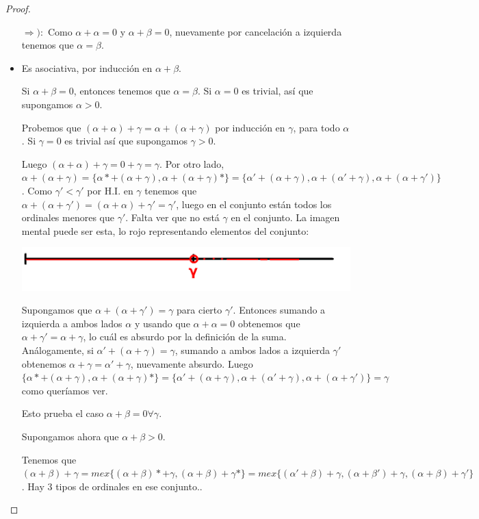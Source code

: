 \documentclass[10pt,a4paper,final]{report}
\def\key#1{\{#1\}}
\begin{document}
\begin{proof}
\begin{itemize}
$\Rightarrow):$ Como $\alpha + \alpha = 0$ y $\alpha + \beta  = 0$, nuevamente por cancelación a izquierda tenemos que $\alpha = \beta$.

\item Es asociativa, por inducción en $\alpha + \beta$.

Si $\alpha + \beta = 0$, entonces tenemos que $\alpha = \beta$. Si $\alpha=0$ es trivial, así que supongamos $\alpha>0$.

Probemos que $(\alpha + \alpha) + \gamma = \alpha + (\alpha + \gamma)$ por inducción en $\gamma$, para todo $\alpha$. Si $\gamma = 0$ es trivial así que supongamos $\gamma > 0$.

Luego $(\alpha + \alpha) + \gamma = 0 + \gamma = \gamma$. Por otro lado, $\alpha + (\alpha + \gamma) = \key{\alpha* + (\alpha + \gamma), \alpha + (\alpha + \gamma)*} = \key{\alpha' + (\alpha + \gamma), \alpha + (\alpha' + \gamma), \alpha + (\alpha + \gamma')}$. Como $\gamma'<\gamma'$ por H.I. en $\gamma$ tenemos que $\alpha + (\alpha + \gamma') = (\alpha + \alpha) + \gamma' = \gamma'$, luego en el conjunto están todos los ordinales menores que $\gamma'$. Falta ver que no está $\gamma$ en el conjunto. La imagen mental puede ser esta, lo rojo representando elementos del conjunto:

\includegraphics[scale=0.3]{mex_gamma.png}

Supongamos que $\alpha + (\alpha + \gamma') = \gamma$ para cierto $\gamma'$. Entonces sumando a izquierda a ambos lados $\alpha$ y usando que $\alpha + \alpha = 0$ obtenemos que $\alpha + \gamma' = \alpha + \gamma$, lo cuál es absurdo por la definición de la suma. Análogamente, si $\alpha' + (\alpha + \gamma) = \gamma$, sumando a ambos lados a izquierda $\gamma'$ obtenemos $\alpha + \gamma = \alpha' + \gamma$, nuevamente absurdo. Luego $\key{\alpha* + (\alpha + \gamma), \alpha + (\alpha + \gamma)*} = \key{\alpha' + (\alpha + \gamma), \alpha + (\alpha' + \gamma), \alpha + (\alpha + \gamma')} = \gamma$ como queríamos ver.

Esto prueba el caso $\alpha + \beta = 0 \forall \gamma$.

Supongamos ahora que $\alpha + \beta > 0$.

Tenemos que $(\alpha + \beta) + \gamma = mex \key{(\alpha + \beta)* + \gamma, (\alpha + \beta) +  \gamma*} = mex \key{(\alpha'+\beta) + \gamma, (\alpha + \beta') + \gamma, (\alpha + \beta) + \gamma'}$. Hay $3$ tipos de ordinales en ese conjunto..


\end{itemize}
\end{proof}
\end{document}
